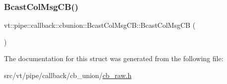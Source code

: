 \subsubsection{\texorpdfstring{Bcast\+Col\+Msg\+C\+B()}{BcastColMsgCB()}}
{\footnotesize\ttfamily vt\+::pipe\+::callback\+::cbunion\+::\+Bcast\+Col\+Msg\+C\+B\+::\+Bcast\+Col\+Msg\+CB (\begin{DoxyParamCaption}{ }\end{DoxyParamCaption})\hspace{0.3cm}{\ttfamily [default]}}



The documentation for this struct was generated from the following file\+:\begin{DoxyCompactItemize}
\item 
src/vt/pipe/callback/cb\+\_\+union/\hyperlink{cb__raw_8h}{cb\+\_\+raw.\+h}\end{DoxyCompactItemize}
